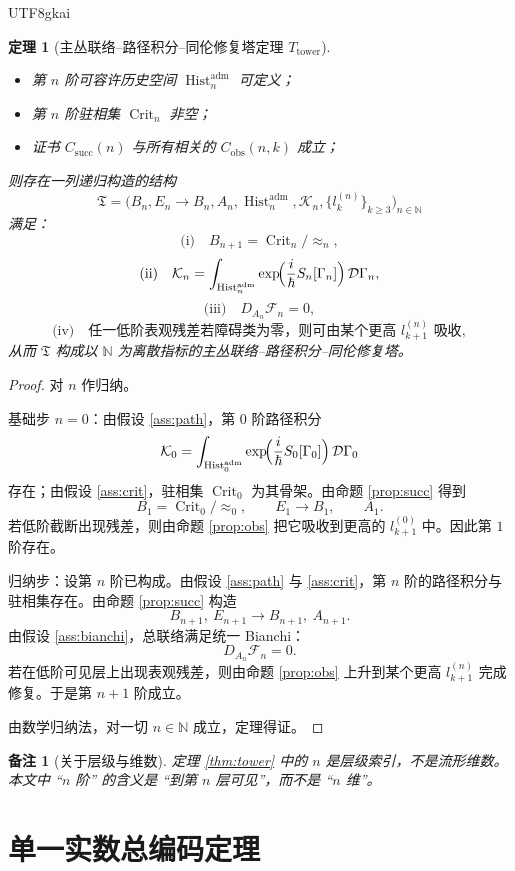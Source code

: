 \documentclass[12pt]{article}
\newtheorem{theorem}{定理}[section]
\newtheorem{remark}{备注}[section]
\newcommand{\NN}{\mathbb{N}}
\newcommand{\Hist}{\operatorname{Hist}}
\newcommand{\Crit}{\operatorname{Crit}}
\begin{document}
\begin{CJK*}{UTF8}{gkai}
\begin{theorem}[主丛联络--路径积分--同伦修复塔定理 $T_{\mathrm{tower}}$]
\begin{itemize}
  \item 第 $n$ 阶可容许历史空间 $\Hist_n^{\mathrm{adm}}$ 可定义；
  \item 第 $n$ 阶驻相集 $\Crit_n$ 非空；
  \item 证书 $C_{\mathrm{succ}}(n)$ 与所有相关的 $C_{\mathrm{obs}}(n,k)$ 成立；
\end{itemize}
则存在一列递归构造的结构
\[
\mathfrak T=
\bigl(B_n,E_n\to B_n,A_n,\Hist_n^{\mathrm{adm}},\mathcal K_n,\{l_k^{(n)}\}_{k\ge 3}\bigr)_{n\in\NN}
\]
满足：
\[
\text{(i)}\quad B_{n+1}=\Crit_n/\!\approx_n,
\]
\[
\text{(ii)}\quad \mathcal K_n=
\int_{\Hist_n^{\mathrm{adm}}}\exp\!\Bigl(\frac{i}{\hbar}S_n[\Gamma_n]\Bigr)\,\mathcal D\Gamma_n,
\]
\[
\text{(iii)}\quad D_{A_n}\mathcal F_n=0,
\]
\[
\text{(iv)}\quad \text{任一低阶表观残差若障碍类为零，则可由某个更高 }l_{k+1}^{(n)}\text{ 吸收},
\]
从而 $\mathfrak T$ 构成以 $\NN$ 为离散指标的主丛联络--路径积分--同伦修复塔。
\end{theorem}

\begin{proof}
对 $n$ 作归纳。

基础步 $n=0$：由假设 \ref{ass:path}，第 $0$ 阶路径积分
\[
\mathcal K_0=
\int_{\Hist_0^{\mathrm{adm}}}\exp\!\Bigl(\frac{i}{\hbar}S_0[\Gamma_0]\Bigr)\,\mathcal D\Gamma_0
\]
存在；由假设 \ref{ass:crit}，驻相集 $\Crit_0$ 为其骨架。由命题 \ref{prop:succ} 得到
\[
B_1=\Crit_0/\!\approx_0,
\qquad
E_1\to B_1,
\qquad
A_1.
\]
若低阶截断出现残差，则由命题 \ref{prop:obs} 把它吸收到更高的 $l_{k+1}^{(0)}$ 中。因此第 $1$ 阶存在。

归纳步：设第 $n$ 阶已构成。由假设 \ref{ass:path} 与 \ref{ass:crit}，第 $n$ 阶的路径积分与驻相集存在。由命题 \ref{prop:succ} 构造
\[
B_{n+1},\ E_{n+1}\to B_{n+1},\ A_{n+1}.
\]
由假设 \ref{ass:bianchi}，总联络满足统一 Bianchi：
\[
D_{A_n}\mathcal F_n=0.
\]
若在低阶可见层上出现表观残差，则由命题 \ref{prop:obs} 上升到某个更高 $l_{k+1}^{(n)}$ 完成修复。于是第 $n+1$ 阶成立。

由数学归纳法，对一切 $n\in\NN$ 成立，定理得证。
\end{proof}

\begin{remark}[关于层级与维数]
定理 \ref{thm:tower} 中的 $n$ 是层级索引，不是流形维数。本文中 ``$n$ 阶'' 的含义是 ``到第 $n$ 层可见''，而不是 ``$n$ 维''。
\end{remark}

\section{单一实数总编码定理}
\label{sec:tex35-realcode}


\end{CJK*}
\end{document}
